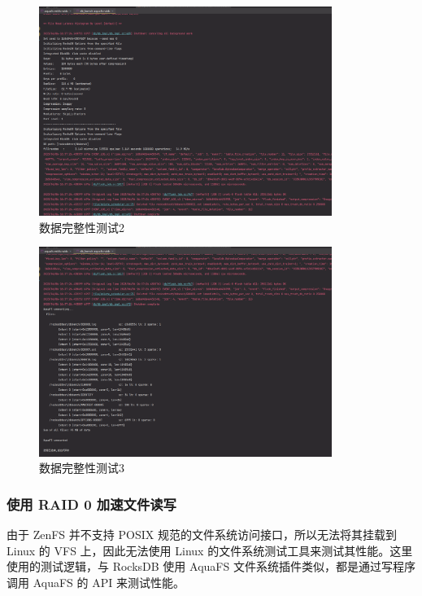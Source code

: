 \begin{figure}[htbp]
  \centering
  \includegraphics[width=0.85\textwidth]{fig/raid-data-check2}
  \caption{ 数据完整性测试2 }
  \label{check-data2}
\end{figure}

\begin{figure}[htbp]
  \centering
  \includegraphics[width=0.85\textwidth]{fig/raid-data-check3}
  \caption{ 数据完整性测试3 }
  \label{check-data3}
\end{figure}

\subsubsection{使用 RAID 0 加速文件读写}

由于 ZenFS 并不支持 POSIX 规范的文件系统访问接口，所以无法将其挂载到 Linux 的 VFS 上，因此无法使用 Linux 的文件系统测试工具来测试其性能。这里使用的测试逻辑，与 RocksDB 使用 AquaFS 文件系统插件类似，都是通过写程序调用 AquaFS 的 API 来测试性能。

